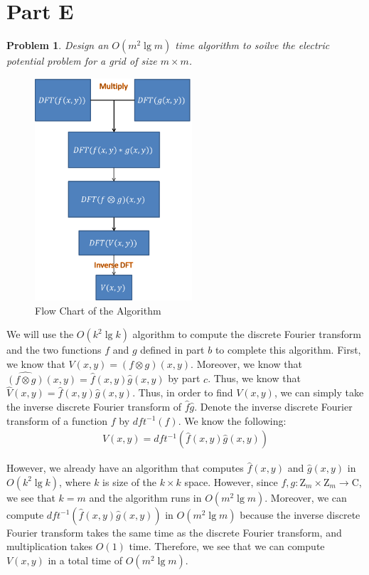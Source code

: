 \documentclass[psamsfonts]{amsart}
\newtheorem{prob}{Problem}[section]
\newenvironment{sol}{{\bfseries Solution}}{\qedsymbol}
\theoremstyle{definition}
\theoremstyle{remark}
\numberwithin{equation}{section}
\begin{document}
\section{Part E}

\begin{prob}
Design an $O(m^2 \lg m)$ time algorithm to soilve the electric potential problem for a grid of size $m \times m$. 
\end{prob}

\begin{sol}
\begin{figure}[h!]
\centering
\includegraphics[width=2.3in]{FlowChart.png}
\caption{Flow Chart of the Algorithm}
\label{flow}
\end{figure}

We will use the $O(k^2 \lg k)$ algorithm to compute the discrete Fourier transform and the two functions $f$ and $g$ defined in part $b$ to complete this algorithm. First, we know that $V(x,y) = (f \otimes g) (x,y)$. Moreover, we know that $\widehat{(f \otimes g)}(x,y) = \widehat{f}(x,y) \widehat{g}(x,y)$ by part $c$. Thus, we know that $\widehat{V}(x,y) =  \widehat{f}(x,y) \widehat{g}(x,y)$. Thus, in order to find $V(x,y)$, we can simply take the inverse discrete Fourier transform of $\widehat{f} \widehat{g}$. Denote the inverse discrete Fourier transform of a function $f$ by $dft^{-1}(f)$. We know the following:
\begin{eqnarray}
V(x,y) = dft^{-1}(\widehat{f}(x,y) \widehat{g}(x,y))
\end{eqnarray}

However, we already have an algorithm that computes $\hat{f}(x,y)$ and $\hat{g}(x,y)$ in $O(k^2 \lg k)$, where $k$ is size of the $k \times k$ space. However, since $f,g : \mathrm{Z}_{m} \times \mathrm{Z}_m \to \mathrm{C}$, we see that $k = m$ and the algorithm runs in $O(m^2 \lg m)$. Moreover, we can compute $dft^{-1} (\widehat{f}(x,y) \widehat{g}(x,y) )$ in $O(m^2 \lg m)$ because the inverse discrete Fourier transform takes the same time as the discrete Fourier transform, and multiplication takes $O(1)$ time. Therefore, we see that we can compute $V(x,y)$ in a total time of $O(m^2 \lg m)$. 


\end{sol}
\end{document}
